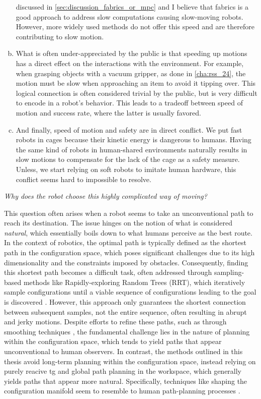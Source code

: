 \begin{enumerate}[(a)]
    discussed in \cref{sec:discussion_fabrics_or_mpc} and I
    believe that \ac{fabrics} is a good approach to
    address slow computations causing slow-moving robots.
    However, more widely used methods do not offer this
    speed and are therefore contributing to slow motion.
  \item What is often under-appreciated by the public is
    that speeding up motions has a direct effect on the
    interactions with the environment. For example, when
    grasping objects with a vacuum gripper, as done in 
    \cref{cha:rss_24}, the motion must be slow when
    approaching an item to avoid it tipping over. This
    logical connection is often considered trivial by the
    public, but is very difficult to encode in a robot's
    behavior. This leads to a tradeoff between speed of
    motion and success rate, where the latter is usually
    favored.
  \item And finally, speed of motion and safety are in direct
    conflict. We put fast robots in cages because their
    kinetic energy is dangerous to humans. Having the same
    kind of robots in human-shared environments naturally 
    results in slow motions to compensate for the lack of
    the cage as a safety measure. Unless, we start relying
    on soft robots to imitate human hardware, this conflict
    seems hard to impossible to resolve.
\end{enumerate}

\textit{Why does the robot choose this highly complicated
way of moving?}

This question often arises when a robot seems to take an
unconventional path to reach its destination. The issue
hinges on the notion of what is considered \textit{natural},
which essentially boils down to what humans perceive as the
best route. In the context of robotics, the optimal
path is typically defined as the shortest path in the
configuration space, which poses significant challenges due
to its high dimensionality and the constraints imposed by
obstacles. Consequently, finding this shortest path becomes
a difficult task, often addressed through sampling-based
methods like Rapidly-exploring Random Trees (RRT), which
iteratively sample configurations until a viable sequence of
configurations leading to the goal is discovered
\cite{Karaman2011}. However, this approach only guarantees
the shortest connection between subsequent samples, not the
entire sequence, often resulting in abrupt and jerky
motions. Despite efforts to refine these paths, such as
through smoothing techniques
\cite{siegwart2011introduction}, the fundamental challenge
lies in the nature of planning within the configuration
space, which tends to yield paths that appear unconventional
to human observers. In contrast, the methods outlined in
this thesis avoid long-term planning within the
configuration space, instead relying on purely reacive \ac{tg}
and global path planning in the workspace, which generally
yields paths that appear more natural. Specifically,
techniques like shaping the configuration manifold seem to
resemble to human path-planning processes
\cite{klein2022riemannian}.

